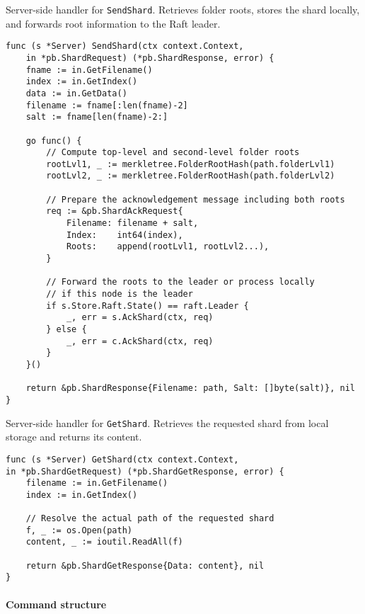 \begin{listing}[H]
\caption{Server-side handler for \texttt{SendShard}. Retrieves folder roots, stores the shard locally, and forwards root information to the Raft leader.}
\label{code:send-shard-server}
\begin{verbatim}
func (s *Server) SendShard(ctx context.Context,
    in *pb.ShardRequest) (*pb.ShardResponse, error) {
    fname := in.GetFilename()
    index := in.GetIndex()
    data := in.GetData()
    filename := fname[:len(fname)-2]
    salt := fname[len(fname)-2:]

    go func() {
        // Compute top-level and second-level folder roots
        rootLvl1, _ := merkletree.FolderRootHash(path.folderLvl1)
        rootLvl2, _ := merkletree.FolderRootHash(path.folderLvl2)

        // Prepare the acknowledgement message including both roots
        req := &pb.ShardAckRequest{
            Filename: filename + salt,
            Index:    int64(index),
            Roots:    append(rootLvl1, rootLvl2...),
        }

        // Forward the roots to the leader or process locally 
        // if this node is the leader
        if s.Store.Raft.State() == raft.Leader {
            _, err = s.AckShard(ctx, req)
        } else {
            _, err = c.AckShard(ctx, req)
        }
    }()

    return &pb.ShardResponse{Filename: path, Salt: []byte(salt)}, nil
}
\end{verbatim}
\end{listing}

\begin{listing}
\caption{Server-side handler for \texttt{GetShard}. Retrieves the requested shard from local storage and returns its content.}
\label{code:get-shard-server}
\begin{verbatim}
func (s *Server) GetShard(ctx context.Context,
in *pb.ShardGetRequest) (*pb.ShardGetResponse, error) {
    filename := in.GetFilename()
    index := in.GetIndex()

    // Resolve the actual path of the requested shard
    f, _ := os.Open(path)
    content, _ := ioutil.ReadAll(f)

    return &pb.ShardGetResponse{Data: content}, nil
}
\end{verbatim}
\end{listing}

\paragraph{Command structure}

